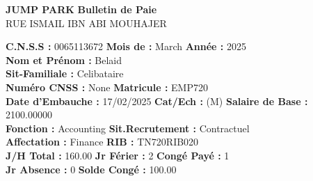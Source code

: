 \documentclass[a4paper,landscape]{article}
\begin{document}
\noindent %
\begin{minipage}{0.48\linewidth} %
    \noindent
\textbf{JUMP PARK}\hfill
\textbf{Bulletin de Paie} \\[0.25cm]
RUE ISMAIL IBN ABI MOUHAJER


\noindent
\textbf{C.N.S.S :} {0065113672} \hfill \textbf{Mois de :} March \hfill \textbf{Année :} 2025\\[0.2cm]


\noindent
\noindent
\textbf{Nom et Prénom :} Belaid\\[0.1cm]
\textbf{Sit-Familiale :} Celibataire\\[0.1cm]
\textbf{Numéro CNSS :} None \hfill \textbf{Matricule :} EMP720\\[0.1cm]
\textbf{Date d'Embauche :} 17/02/2025 \hfill 
\textbf{Cat/Ech :} (M) \hfill 
\textbf{Salaire de Base :} 2100.00000\\[0.1cm]
\textbf{Fonction :} Accounting \hfill 
\textbf{Sit.Recrutement :} Contractuel\\[0.1cm]
\textbf{Affectation :} Finance \hfill 
\textbf{RIB :} TN720RIB020\\[0.1cm]
\textbf{J/H Total :} 160.00 \hfill
\textbf{Jr Férier :} 2 \hfill
\textbf{Congé Payé :} 1\\[0.1cm]
\textbf{Jr Absence :} 0 \hfill
\textbf{Solde Congé :} 100.00



\noindent
\\[0.5cm]
\renewcommand{\arraystretch}{1.25} 
\end{minipage}
\end{document}
